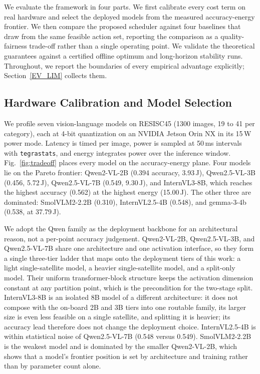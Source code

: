 We evaluate the framework in four parts. We first calibrate every cost term on
real hardware and select the deployed models from the measured accuracy-energy
frontier. We then compare the proposed scheduler against four baselines that
draw from the same feasible action set, reporting the comparison as a
quality-fairness trade-off rather than a single operating point. We validate
the theoretical guarantees against a certified offline optimum and long-horizon
stability runs. Throughout, we report the boundaries of every empirical
advantage explicitly; Section~\ref{EV_LIM} collects them.

\subsection{Hardware Calibration and Model Selection}\label{EV_CALIB}
We profile seven vision-language models on RESISC45 (1300 images, 19 to 41 per
category), each at 4-bit quantization on an NVIDIA Jetson Orin NX in its 15\,W
power mode. Latency is timed per image, power is sampled at 50\,ms intervals
with \texttt{tegrastats}, and energy integrates power over the inference
window. Fig.~\ref{fig:tradeoff} places every model on the accuracy-energy
plane. Four models lie on the Pareto frontier: Qwen2-VL-2B (0.394 accuracy,
3.93\,J), Qwen2.5-VL-3B (0.456, 5.72\,J), Qwen2.5-VL-7B (0.549, 9.30\,J), and
InternVL3-8B, which reaches the highest accuracy (0.562) at the highest energy
(15.00\,J). The other three are dominated: SmolVLM2-2.2B (0.310),
InternVL2.5-4B (0.548), and gemma-3-4b (0.538, at 37.79\,J).

We adopt the Qwen family as the deployment backbone for an architectural
reason, not a per-point accuracy judgement. Qwen2-VL-2B, Qwen2.5-VL-3B, and
Qwen2.5-VL-7B share one architecture and one activation interface, so they form
a single three-tier ladder that maps onto the deployment tiers of this work: a
light single-satellite model, a heavier single-satellite model, and a
split-only model. Their uniform transformer-block structure keeps the
activation dimension constant at any partition point, which is the precondition
for the two-stage split. InternVL3-8B is an isolated 8B model of a different
architecture: it does not compose with the on-board 2B and 3B tiers into one
routable family, its larger size is even less feasible on a single satellite,
and splitting it is heavier; its accuracy lead therefore does not change the
deployment choice. InternVL2.5-4B is within statistical noise of Qwen2.5-VL-7B
(0.548 versus 0.549). SmolVLM2-2.2B is the weakest model and is dominated by
the smaller Qwen2-VL-2B, which shows that a model's frontier position is set by
architecture and training rather than by parameter count alone.

